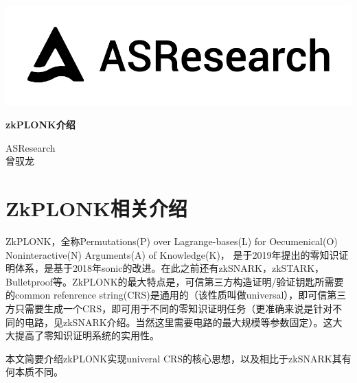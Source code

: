 \documentclass[12pt]{article}
\newcommand{\zk}{zkPLONK}
\begin{document}
\pagestyle{empty}
\renewcommand{\contentsname}{目录}
\renewcommand{\abstractname}{摘要}
\renewcommand{\refname}{参考文献}
\renewcommand{\figurename}{图}
\renewcommand{\tablename}{表}
\renewcommand{\baselinestretch}{1.5}
\renewcommand{\appendixname}{附录}
\renewcommand{\proofname}{证明}

\pagecolor{\pcolor}



\begin{titlepage}
  \begin{center}
    \vspace*{5.5cm}
    \includegraphics[scale=0.5]{../common/logo.png}
    \vspace{0.5cm}


   \textbf{\huge{\zk 介绍}}

    \vspace{0.5cm}
    ASResearch\\曾驭龙
    \textbf{}
  \end{center}

\end{titlepage}
\setcounter{page}{0}
\tableofcontents
\newpage
\setcounter{page}{1}
\pagestyle{fancy}
\vspace*{0.01cm}

\section{ZkPLONK相关介绍}
ZkPLONK，全称Permutations(P) over Lagrange-bases(L) for Oecumenical(O) Noninteractive(N) Arguments(A) of Knowledge(K)，
是于2019年提出的零知识证明体系，是基于2018年sonic的改进。在此之前还有zkSNARK，zkSTARK，Bulletproof等。ZkPLONK的最大特点是，可信第三方构造证明/验证钥匙所需要的common refenrence string(CRS)是通用的（该性质叫做universal），即可信第三方只需要生成一个CRS，即可用于不同的零知识证明任务（更准确来说是针对不同的电路，见zkSNARK介绍。当然这里需要电路的最大规模等参数固定）。这大大提高了零知识证明系统的实用性。

本文简要介绍\zk 实现univeral CRS的核心思想，以及相比于zkSNARK其有何本质不同。
\end{document}

